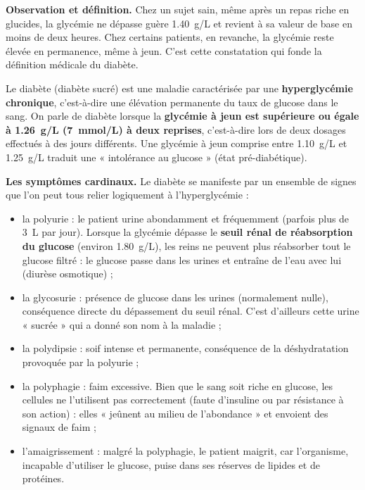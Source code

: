 \documentclass[11pt]{article}
\newcommand{\cle}[1]{{\popxbold\color{popdark}#1}}
\newcounter{popsec}
\newcounter{popsub}
\newcommand{\courssub}[1]{%
  \stepcounter{popsub}%
  \par\vspace{9pt}\noindent{\popxbold\fontsize{11.5}{13}\selectfont\color{popink}{\color{poporange}\thepopsec.\thepopsub}\hspace{6pt}#1}\par\nopagebreak\vspace{4pt}
}
\begin{document}
\courssub{Le diabète : une hyperglycémie chronique}

\textbf{Observation et définition.} Chez un sujet sain, même après un repas riche en glucides, la glycémie ne dépasse guère \SI{1,40}{g/L} et revient à sa valeur de base en moins de deux heures. Chez certains patients, en revanche, la glycémie reste élevée en permanence, même à jeun. C'est cette constatation qui fonde la définition médicale du diabète.

\begin{definition}[Le diabète]
Le \cle{diabète} (diabète sucré) est une maladie caractérisée par une \textbf{hyperglycémie chronique}, c'est-à-dire une élévation permanente du taux de glucose dans le sang. On parle de diabète lorsque la \textbf{glycémie à jeun est supérieure ou égale à \SI{1,26}{g/L} (\SI{7}{mmol/L}) à deux reprises}, c'est-à-dire lors de deux dosages effectués à des jours différents. Une glycémie à jeun comprise entre \SI{1,10}{g/L} et \SI{1,25}{g/L} traduit une « intolérance au glucose » (état pré-diabétique).
\end{definition}

\textbf{Les symptômes cardinaux.} Le diabète se manifeste par un ensemble de signes que l'on peut tous relier logiquement à l'hyperglycémie :

\begin{itemize}
\item la \cle{polyurie} : le patient urine abondamment et fréquemment (parfois plus de \SI{3}{L} par jour). Lorsque la glycémie dépasse le \textbf{seuil rénal de réabsorption du glucose} (environ \SI{1,80}{g/L}), les reins ne peuvent plus réabsorber tout le glucose filtré : le glucose passe dans les urines et entraîne de l'eau avec lui (diurèse osmotique) ;
\item la \cle{glycosurie} : présence de glucose dans les urines (normalement nulle), conséquence directe du dépassement du seuil rénal. C'est d'ailleurs cette urine « sucrée » qui a donné son nom à la maladie ;
\item la \cle{polydipsie} : soif intense et permanente, conséquence de la déshydratation provoquée par la polyurie ;
\item la \cle{polyphagie} : faim excessive. Bien que le sang soit riche en glucose, les cellules ne l'utilisent pas correctement (faute d'insuline ou par résistance à son action) : elles « jeûnent au milieu de l'abondance » et envoient des signaux de faim ;
\item l'\cle{amaigrissement} : malgré la polyphagie, le patient maigrit, car l'organisme, incapable d'utiliser le glucose, puise dans ses réserves de lipides et de protéines.
\end{itemize}
\end{document}
